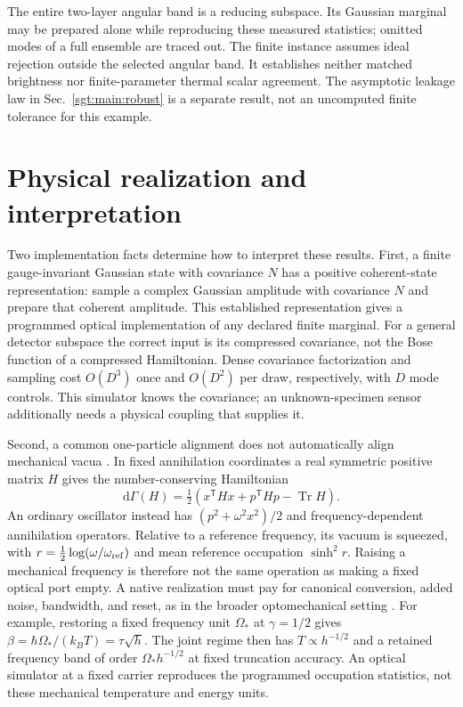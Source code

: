\documentclass[aps,pra,reprint,superscriptaddress,longbibliography]{revtex4-2}
\newcommand{\Tr}{\operatorname{Tr}}
\newcommand{\dd}{\mathrm d}
\begin{document}
The entire two-layer angular band is a reducing subspace. Its Gaussian
marginal may be prepared alone while reproducing these measured
statistics; omitted modes of a full ensemble are traced out. The finite
instance assumes ideal rejection outside the selected angular band.
It establishes neither matched brightness nor finite-parameter thermal
scalar agreement. The asymptotic leakage law in
Sec.~\ref{sgt:main:robust} is a separate result, not an uncomputed
finite tolerance for this example.

\section{Physical realization and interpretation}
\label{sgt:main:physics}

Two implementation facts determine how to interpret these results.
First, a finite gauge-invariant Gaussian state with covariance $N$ has
a positive coherent-state representation: sample a complex Gaussian
amplitude with covariance $N$ and prepare that coherent amplitude.
This established representation \cite{Lu2018} gives a programmed
optical implementation of any declared finite marginal. For a
general detector subspace the correct input is its compressed
covariance, not the Bose function of a compressed Hamiltonian. Dense
covariance factorization and sampling cost $O(D^3)$ once and $O(D^2)$
per draw, respectively, with $D$ mode controls. This simulator knows
the covariance; an unknown-specimen sensor additionally needs a
physical coupling that supplies it.

Second, a common one-particle alignment does not automatically align
mechanical vacua \cite{BruneauDerezinski2007}. In fixed annihilation
coordinates a real symmetric
positive matrix $H$
gives the number-conserving Hamiltonian
\begin{equation}
 \dd\Gamma(H)=\tfrac12(x^{\mathsf T}Hx+p^{\mathsf T}Hp-\Tr H).
 \label{sgt:main:fixedvac}
\end{equation}
An ordinary oscillator instead has
$(p^2+\omega^2x^2)/2$ and frequency-dependent annihilation operators.
Relative to a reference frequency, its vacuum is squeezed, with
$r=\tfrac12\log(\omega/\omega_{\rm ref})$ and mean reference occupation
$\sinh^2r$. Raising a mechanical frequency is therefore not the same
operation as making a fixed optical port empty. A native realization
must pay for canonical conversion, added noise, bandwidth, and reset,
as in the broader optomechanical setting \cite{Aspelmeyer2014}.
For example, restoring a fixed frequency unit $\Omega_*$ at
$\gamma=1/2$ gives $\beta=\hbar\Omega_*/(k_BT)=\tau\sqrt h$.
The joint regime then has $T\propto h^{-1/2}$ and a retained frequency
band of order $\Omega_*h^{-1/2}$ at fixed truncation accuracy.
An optical simulator at a fixed carrier reproduces the programmed
occupation statistics, not these mechanical temperature and energy units.
\end{document}
